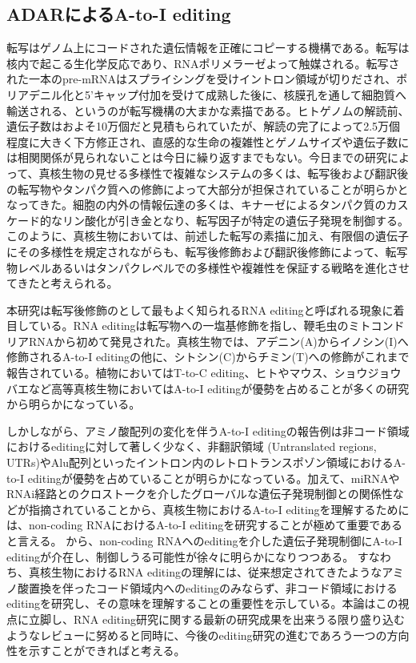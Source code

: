 \subsection{ADARによるA-to-I editing}
転写はゲノム上にコードされた遺伝情報を正確にコピーする機構である。転写は核内で起こる生化学反応であり、RNAポリメラーゼよって触媒される。転写された一本のpre-mRNAはスプライシングを受けイントロン領域が切りだされ、ポリアデニル化と5'キャップ付加を受けて成熟した後に、核膜孔を通して細胞質へ輸送される、というのが転写機構の大まかな素描である。ヒトゲノムの解読前、遺伝子数はおよそ10万個だと見積もられていたが、解読の完了によって2.5万個程度に大きく下方修正され、直感的な生命の複雑性とゲノムサイズや遺伝子数には相関関係が見られないことは今日に繰り返すまでもない。今日までの研究によって、真核生物の見せる多様性で複雑なシステムの多くは、転写後および翻訳後の転写物やタンパク質への修飾によって大部分が担保されていることが明らかとなってきた。細胞の内外の情報伝達の多くは、キナーゼによるタンパク質のカスケード的なリン酸化が引き金となり、転写因子が特定の遺伝子発現を制御する。このように、真核生物においては、前述した転写の素描に加え、有限個の遺伝子にその多様性を規定されながらも、転写後修飾および翻訳後修飾によって、転写物レベルあるいはタンパクレベルでの多様性や複雑性を保証する戦略を進化させてきたと考えられる。
\par
本研究は転写後修飾のとして最もよく知られるRNA editingと呼ばれる現象に着目している。RNA editingは転写物への一塩基修飾を指し、鞭毛虫のミトコンドリアRNAから初めて発見された。真核生物では、アデニン(A)からイノシン(I)へ修飾されるA-to-I editingの他に、シトシン(C)からチミン(T)への修飾がこれまで報告されている。植物においてはT-to-C editing、ヒトやマウス、ショウジョウバエなど高等真核生物においてはA-to-I editingが優勢を占めることが多くの研究から明らかになっている。
\par
しかしながら、アミノ酸配列の変化を伴うA-to-I editingの報告例は非コード領域におけるeditingに対して著しく少なく、非翻訳領域 (Untranslated regions, UTRs)やAlu配列といったイントロン内のレトロトランスポゾン領域におけるA-to-I editingが優勢を占めていることが明らかになっている。加えて、miRNAやRNAi経路とのクロストークを介したグローバルな遺伝子発現制御との関係性などが指摘されていることから、真核生物におけるA-to-I editingを理解するためには、non-coding RNAにおけるA-to-I editingを研究することが極めて重要であると言える。
から、non-coding RNAへのeditingを介した遺伝子発現制御にA-to-I editingが介在し、制御しうる可能性が徐々に明らかになりつつある。
すなわち、真核生物におけるRNA editingの理解には、従来想定されてきたようなアミノ酸置換を伴ったコード領域内へのeditingのみならず、非コード領域におけるeditingを研究し、その意味を理解することの重要性を示している。本論はこの視点に立脚し、RNA editing研究に関する最新の研究成果を出来うる限り盛り込むようなレビューに努めると同時に、今後のediting研究の進むであろう一つの方向性を示すことができればと考える。


